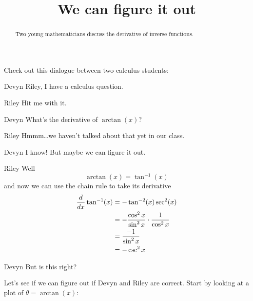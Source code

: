 \documentclass{ximera}
\title[Break-Ground:]{We can figure it out}
\begin{document}
\begin{abstract}
Two young mathematicians discuss the derivative of inverse functions.
\end{abstract}
\maketitle

Check out this dialogue between two calculus students:

\begin{dialogue}
\item[Devyn] Riley, I have a calculus question.
\item[Riley] Hit me with it.
\item[Devyn] What's the derivative of $\arctan(x)$?
\item[Riley] Hmmm\dots we haven't talked about that yet in our class.
\item[Devyn] I know! But maybe we can figure it out.
\item[Riley] Well
  \[
  \arctan(x) = \tan^{-1}(x)
  \]
  and now we can use the chain rule to take its derivative
  \begin{align*}
    \frac{d}{dx} \tan^{-1}(x) &= -\tan^{-2}(x)\sec^2(x)\\
    &= -\frac{\cos^2x}{\sin^2x}\cdot \frac{1}{\cos^2x}\\
    &= \frac{-1}{\sin^2x}\\
    &= -\csc^2x
  \end{align*}
\item[Devyn] But is this right?
\end{dialogue}

Let's see if we can figure out if Devyn and Riley are correct. Start by looking at a plot of $\theta = \arctan(x)$:
\end{document}
